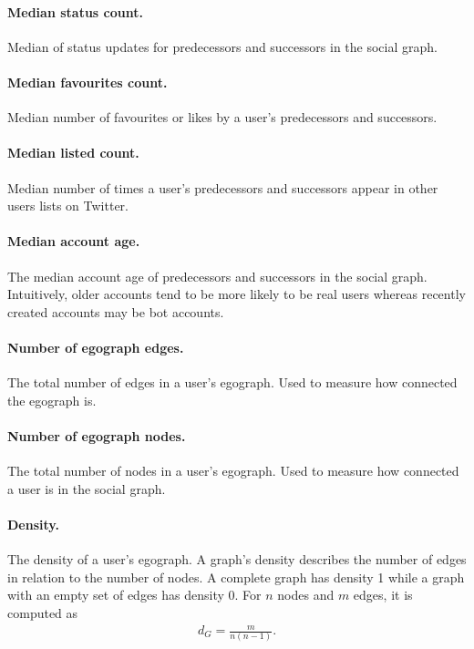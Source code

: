 \paragraph{Median status count.} Median of status updates for predecessors and successors in the social graph.

\paragraph{Median favourites count.} Median number of favourites or likes by a user's predecessors and successors.

\paragraph{Median listed count.} Median number of times a user's predecessors and successors appear in other users lists on Twitter.

\paragraph{Median account age.} The median account age of predecessors and successors in the social graph. Intuitively, older accounts tend to be more likely to be real users whereas recently created accounts may be bot accounts.

\paragraph{Number of egograph edges.} The total number of edges in a user's egograph. Used to measure how connected the egograph is.

\paragraph{Number of egograph nodes.} The total number of nodes in a user's egograph. Used to measure how connected a user is in the social graph.

\paragraph{Density.} The density of a user's egograph. A graph's density describes the number of edges in relation to the number of nodes. A complete graph has density 1 while a graph with an empty set of edges has density 0. For $n$ nodes and $m$ edges, it is computed as
\begin{align*}
    d_G = \frac{m}{n(n-1)}.
\end{align*}

